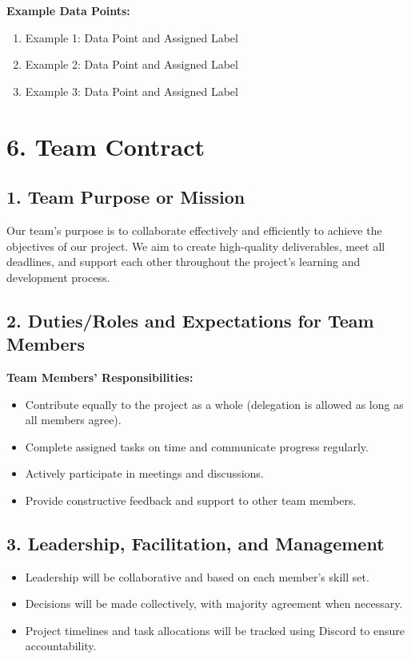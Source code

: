 \documentclass{article}
\begin{document}
\textbf{Example Data Points:}
\begin{enumerate}
    \item Example 1: Data Point and Assigned Label
    \item Example 2: Data Point and Assigned Label
    \item Example 3: Data Point and Assigned Label
\end{enumerate}

\section*{6. Team Contract}

\vspace{0.5cm}

\subsection*{1. Team Purpose or Mission}
Our team’s purpose is to collaborate effectively and efficiently to achieve the objectives of our project. We aim to create high-quality deliverables, meet all deadlines, and support each other throughout the project's learning and development process.

\subsection*{2. Duties/Roles and Expectations for Team Members}

\textbf{Team Members’ Responsibilities:}
\begin{itemize}
    \item Contribute equally to the project as a whole (delegation is allowed as long as all members agree).
    \item Complete assigned tasks on time and communicate progress regularly.
    \item Actively participate in meetings and discussions.
    \item Provide constructive feedback and support to other team members.
\end{itemize}

\subsection*{3. Leadership, Facilitation, and Management}
\begin{itemize}
    \item Leadership will be collaborative and based on each member’s skill set.
    \item Decisions will be made collectively, with majority agreement when necessary.
    \item Project timelines and task allocations will be tracked using Discord to ensure accountability.
\end{itemize}
\end{document}
